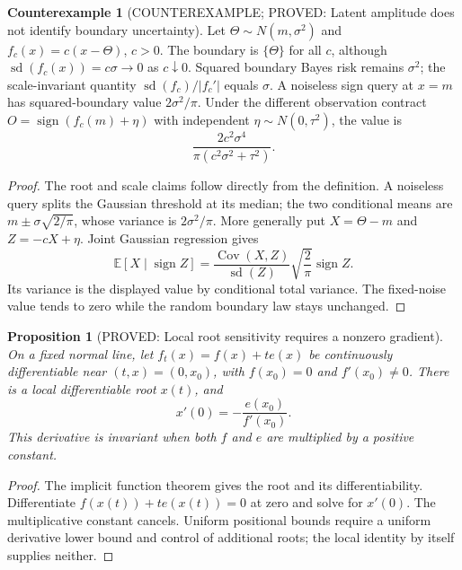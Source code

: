 \documentclass[11pt]{article}
\newcommand{\E}{\mathbb E}
\newtheorem{proposition}[theorem]{Proposition}
\theoremstyle{definition}
\newtheorem{counterexample}[theorem]{Counterexample}
\theoremstyle{remark}
\begin{document}
\begin{counterexample}[COUNTEREXAMPLE; PROVED: Latent amplitude does not identify boundary uncertainty]
\label{rthreegeo:scale}
Let $\Theta\sim N(m,\sigma^2)$ and $f_c(x)=c(x-\Theta)$, $c>0$.
The boundary is $\{\Theta\}$ for all $c$, although
$\operatorname{sd}(f_c(x))=c\sigma\to0$ as $c\downarrow0$.
Squared boundary Bayes risk remains $\sigma^2$; the scale-invariant
quantity $\operatorname{sd}(f_c)/|f_c'|$ equals $\sigma$.
A noiseless sign query at $x=m$ has squared-boundary value
$2\sigma^2/\pi$. Under the different observation contract
$O=\operatorname{sign}(f_c(m)+\eta)$ with independent
$\eta\sim N(0,\tau^2)$, the value is
\[
 \frac{2c^2\sigma^4}{\pi(c^2\sigma^2+\tau^2)}.
\]
\end{counterexample}
\begin{proof}
The root and scale claims follow directly from the definition.
A noiseless query splits the Gaussian threshold at its median; the two
conditional means are $m\pm\sigma\sqrt{2/\pi}$, whose variance is
$2\sigma^2/\pi$. More generally put $X=\Theta-m$ and
$Z=-cX+\eta$. Joint Gaussian regression gives
\[
 \E[X\mid\operatorname{sign}Z]
 =\frac{\operatorname{Cov}(X,Z)}{\operatorname{sd}(Z)}
   \sqrt{\frac2\pi}\operatorname{sign}Z.
\]
Its variance is the displayed value by conditional total variance.
The fixed-noise value tends to zero while the random boundary law stays
unchanged.
\end{proof}

\begin{proposition}[PROVED: Local root sensitivity requires a nonzero gradient]
\label{rthreegeo:rootsensitivity}
On a fixed normal line, let $f_t(x)=f(x)+t e(x)$ be continuously
differentiable near $(t,x)=(0,x_0)$, with $f(x_0)=0$ and
$f'(x_0)\ne0$. There is a local differentiable root $x(t)$, and
\[
 x'(0)=-\frac{e(x_0)}{f'(x_0)}.
\]
This derivative is invariant when both $f$ and $e$ are multiplied by a
positive constant.
\end{proposition}
\begin{proof}
The implicit function theorem gives the root and its differentiability.
Differentiate $f(x(t))+t e(x(t))=0$ at zero and solve for $x'(0)$.
The multiplicative constant cancels. Uniform positional bounds require
a uniform derivative lower bound and control of additional roots;
the local identity by itself supplies neither.
\end{proof}
\end{document}
